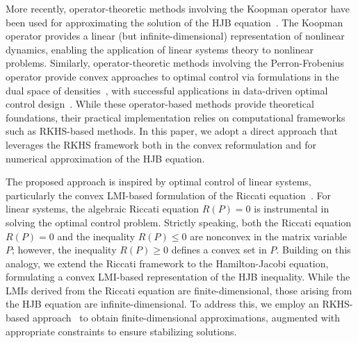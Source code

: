 \documentclass[11pt]{article}
\begin{document}
More recently, operator-theoretic methods involving the Koopman operator have been used for approximating the solution of the HJB equation~\cite{vaidya_koopman_hj_2025}. The Koopman operator provides a linear (but infinite-dimensional) representation of nonlinear dynamics, enabling the application of linear systems theory to nonlinear problems. Similarly, operator-theoretic methods involving the Perron-Frobenius operator provide convex approaches to optimal control via formulations in the dual space of densities~\cite{raghunathan_vaidya_2013}, with successful applications in data-driven optimal control design~\cite{huang_vaidya_2022, moyalan_choi_chen_vaidya_2023, vaidya_tellez_2023}. While these operator-based methods provide theoretical foundations, their practical implementation relies on computational frameworks such as RKHS-based methods. In this paper, we adopt a direct approach that leverages the RKHS framework both in the convex reformulation and for numerical approximation of the HJB equation.

The proposed approach is inspired by optimal control of linear systems, particularly the convex LMI-based formulation of the Riccati equation~\cite{boyd_cvxbook}. For linear systems, the algebraic Riccati equation $R(P) = 0$ is instrumental in solving the optimal control problem. Strictly speaking, both the Riccati equation $R(P) = 0$ and the inequality $R(P) \leq 0$ are nonconvex in the matrix variable $P$; however, the inequality $R(P) \geq 0$ defines a convex set in $P$. Building on this analogy, we extend the Riccati framework to the Hamilton-Jacobi equation, formulating a convex LMI-based representation of the HJB inequality. While the LMIs derived from the Riccati equation are finite-dimensional, those arising from the HJB equation are infinite-dimensional. To address this, we employ an RKHS-based approach~\cite{rkhs_approximation} to obtain finite-dimensional approximations, augmented with appropriate constraints to ensure stabilizing solutions.
\end{document}
